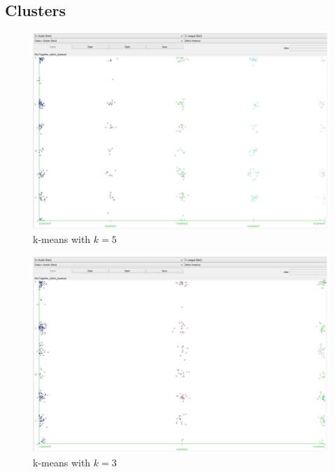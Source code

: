\documentclass[a4paper,11pt]{article}
\begin{document}
\subsection{Clusters}
  \begin{figure}[H]
    \centering
    \includegraphics[width=.95\linewidth]{cluster-5}
    \caption{k-means with $k = 5$}
  \end{figure}
  \begin{figure}[H]
    \centering
    \includegraphics[width=.95\linewidth]{cluster-3}
    \caption{k-means with $k = 3$}
  \end{figure}
\end{document}
